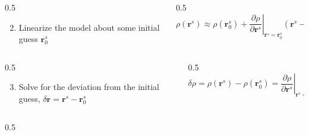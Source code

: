 \begin{frame}[label=gnss_ls_bk]
\begin{columns}
    \end{columns}
    \begin{columns}
        \begin{column}{0.5\textwidth}
            {\setlength{\leftmargini}{1em} \begin{enumerate}   \setcounter{enumi}{1}
                \item \alert{Linearize the model} about some initial guess \(\mathbf{r}_0^s\)
            \end{enumerate}}
        \end{column}
        \begin{column}{0.5\textwidth}
            \scriptsize \begin{equation*}
                \rho \left( \mathbf{r}^{s} \right) \approx  \rho\left( \mathbf{r}^{s}_{0} \right) + \left. \frac{\partial \rho}{\partial \mathbf{r}^{s} } \right|_{\mathbf{r}^{s} = \mathbf{r}^{s}_0} \left( \mathbf{r}^{s} - \mathbf{r}^{s}_{0} \right)^{\top}
            \end{equation*}
        \end{column}
    \end{columns}
    \begin{columns}
        \begin{column}{0.5\textwidth}
             {\setlength{\leftmargini}{1em} \begin{enumerate}   \setcounter{enumi}{2}
                \item \alert{Solve for the deviation} from the initial guess, \(\delta \mathbf{r} = \mathbf{r}^{s} - \mathbf{r}^{s}_{0}\)
            \end{enumerate}}
        \end{column}
        \begin{column}{0.5\textwidth}
            \scriptsize \begin{equation*}
                 \delta\rho =  \rho\left( \mathbf{r}^{s} \right)  -  \rho\left( \mathbf{r}^{s}_{0} \right) = \left. \frac{\partial \rho}{\partial \mathbf{r}^{s} } \right|_{\mathbf{r}^{s} = \mathbf{r}^{s}_0} \delta \mathbf{r}^{\top} + \varepsilon
            \end{equation*}
        \end{column}
    \end{columns}
    \begin{columns}
        \begin{column}{0.5\textwidth}
            {\setlength{\leftmargini}{1em} \begin{enumerate}   \setcounter{enumi}{3}

\end{enumerate}}
\end{column}
\end{columns}
\end{frame}

